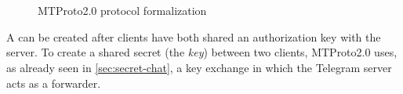 \section{\Schat{}}
\label{sec:secret-chat-formalization}

\begin{figure}[!t]
  \setlength{\instdist}{3cm}
  \setmscoptions
  \begin{msc}{}



    \nextlevel[7]
    \nextlevel


    \nextlevel[6]
    \nextlevel


    \nextlevel[3]
    \nextlevel[4]

  \end{msc}

  \centering
  \caption{MTProto2.0 \Schat{} protocol formalization}
  \label{fig:secret-chat-protocol-formalization}
\end{figure}

A \schat{} can be created after clients have both shared an authorization key with the server. To create a shared secret (the \textit{\schat{} key}) between two clients, MTProto2.0 uses, as already seen in \cref{sec:secret-chat}, a \DiHe{} key exchange in which the Telegram server acts as a forwarder.

